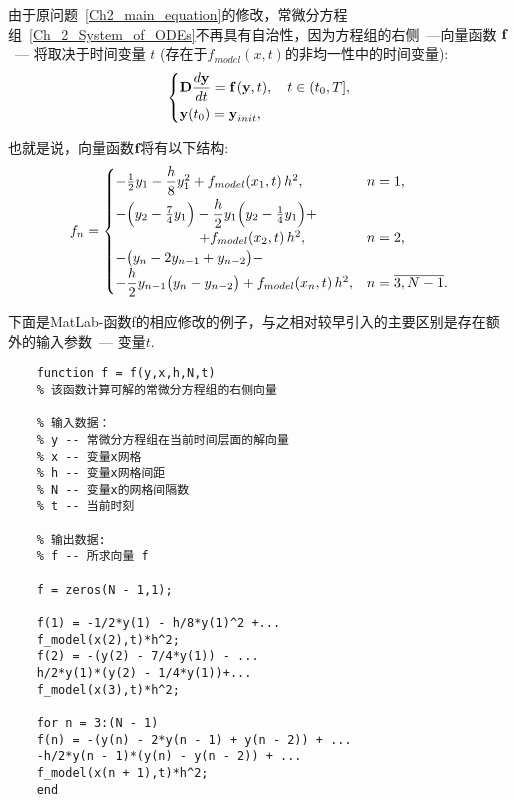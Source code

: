 \documentclass[twoside]{book}
\def\textbf{\bf}%
\begin{document}
\begin{CJK*}{GBK}{song}
	 由于原问题~\eqref{Ch2_main_equation}的修改，常微分方程组~\eqref{Ch_2_System_of_ODEs}不再具有自治性，因为方程组的右侧~---向量函数 $\emph{\textbf{f}}$~--- 将取决于时间变量 $t$ (存在于$f_{model}(x,t)$的非均一性中的时间变量):
	\begin{equation*}
		\left\{
		\begin{aligned}
			&\emph{\textbf{D}} \dfrac{d \emph{\textbf{y}}}{d t} = \emph{\textbf{f}} \, (\emph{\textbf{y}},t), \quad t \in (t_0,T],\\
			&\emph{\textbf{y}}(t_0) = \emph{\textbf{y}}_{init},
		\end{aligned}
		\right.
	\end{equation*}
	
	也就是说，向量函数$\emph{\textbf{f}}$将有以下结构:
	\begin{equation*}
		f_n = \begin{cases}
			\vspace{0.1cm}
			-\frac{1}{2}y_1 - \dfrac{h}{8} y_1^2 + f_{model}(x_1,t) \, h^2,&\text{$n = 1$,}\\
			- \Big(y_{2} - \frac{7}{4}y_1\Big) - \dfrac{h}{2}y_1 \Big(y_{2} - \frac{1}{4}y_{1}\Big) + \\
			\qquad\qquad\qquad + f_{model}(x_2,t) \, h^2,&\text{$n = 2$,}\\
			- \big(y_{n} - 2y_{n - 1} + y_{n - 2}\big) - \\
			- \dfrac{h}{2}y_{n - 1} \big(y_{n} - y_{n - 2}\big) + f_{model}(x_n,t) \, h^2,&\text{$n = \overline{3,N-1}$.}\\
		\end{cases}
	\end{equation*}



\newpage	

	下面是MatLab-函数f的相应修改的例子，与之相对较早引入的主要区别是存在额外的输入参数~--- 变量$t$.
\begin{lstlisting}
	function f = f(y,x,h,N,t)
	% 该函数计算可解的常微分方程组的右侧向量
	
	% 输入数据：
	% y -- 常微分方程组在当前时间层面的解向量
	% x -- 变量x网格
	% h -- 变量x网格间距
	% N -- 变量x的网格间隔数
	% t -- 当前时刻
	
	% 输出数据:
	% f -- 所求向量 f
	
	f = zeros(N - 1,1);
	
	f(1) = -1/2*y(1) - h/8*y(1)^2 +...
	f_model(x(2),t)*h^2;
	f(2) = -(y(2) - 7/4*y(1)) - ...
	h/2*y(1)*(y(2) - 1/4*y(1))+...
	f_model(x(3),t)*h^2;

	for n = 3:(N - 1)
	f(n) = -(y(n) - 2*y(n - 1) + y(n - 2)) + ...
	-h/2*y(n - 1)*(y(n) - y(n - 2)) + ...
	f_model(x(n + 1),t)*h^2;
	end
	

\end{lstlisting}
\end{CJK*}
\end{document}
